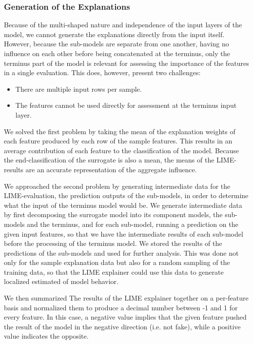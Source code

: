 \documentclass{article}
\begin{document}
			\subsubsection{Generation of the Explanations}
			Because of the multi-shaped nature and independence of the input layers of the model,
			we cannot generate the explanations directly from the input itself. However, because
			the sub-models are separate from one another, having no influence on each other before
			being concatenated at the terminus, only the terminus part of the model is relevant
			for assessing the importance of the features in a single evaluation. This does,
			however, present two challenges:
			\begin{itemize}
				\item There are multiple input rows per sample.
				\item The features cannot be used directly for assessment at the terminus input
					layer.
			\end{itemize}
			We solved the first problem by taking the mean of the explanation weights of each
			feature produced by each row of the sample features. This results in an average
			contribution of each feature to the classification of the model. Because the
			end-classification of the surrogate is also a mean, the means of the LIME-results are
			an accurate representation of the aggregate influence.
			\par
			We approached the second problem by generating intermediate data for the
			LIME-evaluation, the prediction outputs of the sub-models, in order to determine what
			the input of the terminus model would be. We generate intermediate data by first
			decomposing the surrogate model into its component models, the sub-models and the
			terminus, and for each sub-model, running a prediction on the given input features, so
			that we have the intermediate results of each sub-model before the processing of the
			terminus model. We stored the results of the predictions of the sub-models and used
			for further analysis. This was done not only for the sample explanation data but also
			for a random sampling of the training data, so that the LIME explainer could use this
			data to generate localized estimated of model behavior.
			\par
			We then summarized The results of the LIME explainer together on a per-feature basis
			and normalized them to produce a decimal number between -1 and 1 for every feature. In
			this case, a negative value implies that the given feature pushed the result of the
			model in the negative direction (i.e. not fake), while a positive value indicates the
			opposite.
\end{document}
